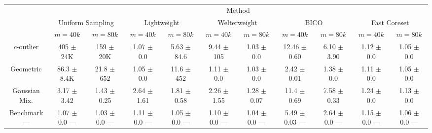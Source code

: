 \begin{table*}
    \centering
    \vspace*{-0.1cm}
    \small
    \renewcommand{\arraystretch}{0.9}
    \begin{tabular}{|c|cc|cc|cc|cc|cc|}
        \hline
        & \multicolumn{10}{c|}{Method} \\
        \cline{2-11} & \multicolumn{2}{c|}{Uniform Sampling} & \multicolumn{2}{c|}{Lightweight} & \multicolumn{2}{c|}{Welterweight} & \multicolumn{2}{c|}{BICO} & \multicolumn{2}{c|}{Fast Coreset} \\
        & $m=40k$ & $m=80k$ & $m=40k$ & $m=80k$ & $m=40k$ & $m=80k$ & $m=40k$ & $m=80k$ & $m=40k$ & $m=80k$ \\
        \cline{2-11}
        $c$-outlier & 405 $\pm$ 24K & 159 $\pm$ 20K & 1.07 $\pm$ 0.0 & 5.63 $\pm$ 84.6 & 9.44 $\pm$ 105 & 1.03 $\pm$ 0.0 & 12.46 $\pm$ 0.60 & 6.10 $\pm$ 3.90 & 1.12 $\pm$ 0.0 & 1.05 $\pm$ 0.0 \\
        Geometric & 86.3 $\pm$ 8.4K & 21.8 $\pm$ 652 & 1.05 $\pm$ 0.0 & 11.6 $\pm$ 452 & 1.11 $\pm$ 0.0 & 1.03 $\pm$ 0.0 & 2.42 $\pm$ 0.01 & 1.38 $\pm$ 0.0 & 1.11 $\pm$ 0.0 & 1.05 $\pm$ 0.0 \\
        Gaussian Mix. & 3.17 $\pm$ 3.42 & 1.43 $\pm$ 0.25 & 2.64 $\pm$ 1.61 & 1.81 $\pm$ 0.58 & 2.26 $\pm$ 1.55 & 1.28 $\pm$ 0.07 & 11.4 $\pm$ 0.69 & 7.58 $\pm$ 0.33 & 1.24 $\pm$ 0.0 & 1.13 $\pm$ 0.0 \\
        \makecell{Benchmark\\---} & \makecell{1.07 $\pm$ 0.0\\---} & \makecell{1.03 $\pm$ 0.0\\---} & \makecell{1.11 $\pm$ 0.0\\---} & \makecell{1.05 $\pm$
        0.0\\---} & \makecell{1.10 $\pm$ 0.0\\---} & \makecell{1.04 $\pm$ 0.0\\---} & \makecell{5.49 $\pm$ 0.03\\---} & \makecell{2.64 $\pm$ 0.0\\---}
          & \makecell{1.15 $\pm$ 0.0\\---} & \makecell{1.06 $\pm$ 0.0\\---} \\


\end{tabular}
\end{table*}
